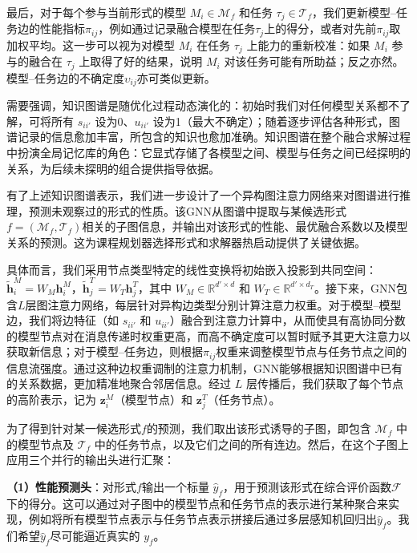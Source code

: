 \documentclass[../main.tex]{subfiles}
\begin{document}
最后，对于每个参与当前形式的模型 $M_i\in \mathcal{M}_f$ 和任务 $\tau_j \in \mathcal{T}_f$，我们更新模型--任务边的性能指标$\pi_{ij}$，例如通过记录融合模型在任务$\tau_j$上的得分，或者对先前$\pi_{ij}$取加权平均。这一步可以视为对模型 $M_i$ 在任务 $\tau_j$ 上能力的重新校准：如果 $M_i$ 参与的融合在 $\tau_j$ 上取得了好的结果，说明 $M_i$ 对该任务可能有所助益；反之亦然。模型--任务边的不确定度$\upsilon_{ij}$亦可类似更新。

需要强调，知识图谱是随优化过程动态演化的：初始时我们对任何模型关系都不了解，可将所有 $s_{ii'}$ 设为0、$u_{ii'}$ 设为1（最大不确定）；随着逐步评估各种形式，图谱记录的信息愈加丰富，所包含的知识也愈加准确。知识图谱在整个融合求解过程中扮演全局记忆库的角色：它显式存储了各模型之间、模型与任务之间已经探明的关系，为后续未探明的组合提供指导依据。


有了上述知识图谱表示，我们进一步设计了一个异构图注意力网络来对图谱进行推理，预测未观察过的形式的性质。该GNN从图谱中提取与某候选形式$f=(\mathcal{M}_f,\mathcal{T}_f)$相关的子图信息，并输出对该形式的性能、最优融合系数以及模型关系的预测。这为课程规划器选择形式和求解器热启动提供了关键依据。

具体而言，我们采用节点类型特定的线性变换将初始嵌入投影到共同空间：$\tilde{\mathbf{h}}^{M}_i = W_M \mathbf{h}^{M}_i$，$\tilde{\mathbf{h}}^{T}_j = W_T \mathbf{h}^{T}_j$，其中 $W_M \in \mathbb{R}^{d'\times d}$ 和 $W_T \in \mathbb{R}^{d'\times d_T}$。接下来，GNN包含$L$层图注意力网络，每层针对异构边类型分别计算注意力权重。对于模型--模型边，我们将边特征（如 $s_{ii'}$ 和 $u_{ii'}$）融合到注意力计算中，从而使具有高协同分数的模型节点对在消息传递时权重更高，而高不确定度可以暂时赋予其更大注意力以获取新信息；对于模型--任务边，则根据$\pi_{ij}$权重来调整模型节点与任务节点之间的信息流强度。通过这种边权重调制的注意力机制，GNN能够根据知识图谱中已有的关系数据，更加精准地聚合邻居信息。经过 $L$ 层传播后，我们获取了每个节点的高阶表示，记为 $\mathbf{z}^M_i$（模型节点）和 $\mathbf{z}^T_j$（任务节点）。

为了得到针对某一候选形式$f$的预测，我们取出该形式诱导的子图，即包含 $\mathcal{M}_f$ 中的模型节点及 $\mathcal{T}_f$ 中的任务节点，以及它们之间的所有连边。然后，在这个子图上应用三个并行的输出头进行汇聚：

\textbf{（1）性能预测头}：对形式$f$输出一个标量 $\hat{y}_f$，用于预测该形式在综合评价函数$\mathcal{F}$下的得分。这可以通过对子图中的模型节点和任务节点的表示进行某种聚合来实现，例如将所有模型节点表示与任务节点表示拼接后通过多层感知机回归出$\hat{y}_f$。我们希望$\hat{y}_f$尽可能逼近真实的 $y_f$。
\end{document}
